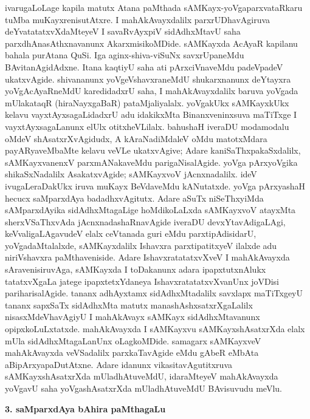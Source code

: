 ivarugaLoLage kapila matutx Atana paMthada sAMKayx-yoVgaparxvataRkaru tuMba muKayxrenisutAtxre. I mahAkAvayxdalilx parxrUDhavAgiruva deYvatatatxvXdaMteyeV I savaRvAyxpiV sidAdhxMtavU saha parxdhAnasAthxnavanunx AkarxmisikoMDide. sAMKayxda AcAyaR kapilanu bahala purAtana QuSi. Iga aginx-shiva-viSuNx savxrUpaneMdu BAvitanAgidAdxne. Itana kaqtiyU saha ati pArxciVnaveMdu padeVpadeV ukatxvAgide. shivananunx yoVgeVshavxraneMdU shukarxnanunx deYtayxra yoVgAcAyaRneMdU karedidadxrU saha, I mahAkAvayxdalilx baruva yoVgada mUlakataqR (hiraNayxgaBaR) pataMjaliyalalx. yoVgakUkx sAMKayxkUkx kelavu vayxtAyxsagaLidadxrU adu idakikxMta Binanxveninxsuva maTiTxge I vayxtAyxsagaLanunx elUlx otitxheVLilalx. bahushaH iveraDU modamodalu oMdeV shAsatxrXvAgidudx, A kAraNadiMdaleV oMdu matotxMdara payARyaveMbaMte kelavu veVLe ukatxvAgive; Adare kaniSaThxpakaSxdalilx, sAMKayxvanenxV parxmANakaveMdu parigaNisalAgide. yoVga pArxyoVgika shikaSxNadalilx AsakatxvAgide; sAMKayxvoV jAcnxnadalilx. ideV ivugaLeraDakUkx iruva muKayx BeVdaveMdu kANutatxde. yoVga pArxyashaH hecucx saMparxdAya badadhxvAgitutx. Adare aSuTx niSeThxyiMda sAMparxdAyika sidAdhxMtagaLige hoMdikoLaLxda sAMKayxvoV atayxMta sherxVSaThxvAda jAcnxnadashaRnavAgide  iveraDU devxYtavAdigaLAgi, keVvaligaLAgavudeV elalx ceVtanada guri eMdu parxtipAdisidarU, yoVgadaMtalalxde, sAMKayxdalilx Ishavxra parxtipatitxyeV ilalxde adu niriVshavxra paMthaveniside. Adare IshavxratatatxvXveV I mahAkAvayxda sAravenisiruvAga, sAMKayxda I toDakanunx adara ipapxtutxnAlukx tatatxvXgaLa jatege ipapxtetxYdaneya IshavxratatatxvXvanUnx joVDisi pariharisalAgide. tananx adhAyxtamx sidAdhxMtadalilx savxlapx maTiTxgeyU tananx sapxSaTx sidAdhxMta matutx manashAshxsatxrXgaLalilx nisasxMdeVhavAgiyU I mahAkAvayx sAMKayx sidAdhxMtavanunx opipxkoLuLxtatxde. mahAkAvayxda I sAMKayxvu sAMKayxshAsatxrXda elalx mUla sidAdhxMtagaLanUnx oLagkoMDide. samagarx sAMKayxveV mahAkAvayxda veVSadalilx parxkaTavAgide eMdu gAbeR eMbAta aBipArxyapaDutAtxne. Adare idanunx vikasitavAgutitxruva sAMKayxshAsatxrXda mUladhAtuveMdU, idaraMteyeV mahAkAvayxda yoVgavU saha yoVgashAsatxrXda mUladhAtuveMdU BAvisuvudu meVlu.

\smallskip
\begin{center}
{\Large\bf 3. saMparxdAya bAhira paMthagaLu}
\end{center}


